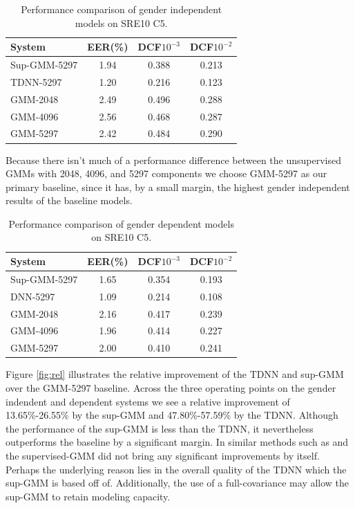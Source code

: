 \documentclass{article}
\begin{document}
\begin{table}
\begin{center}
\begin{tabular}{l|ccc}
\hline
System & EER(\%) & DCF$10^{-3}$ & DCF$10^{-2}$ \\ \hline \hline
Sup-GMM-5297 & 1.94 & 0.388 & 0.213 \\
TDNN-5297 & 1.20 & 0.216 & 0.123 \\
GMM-2048 & 2.49 & 0.496 & 0.288 \\
GMM-4096 & 2.56 & 0.468 & 0.287 \\
GMM-5297 & 2.42 & 0.484 & 0.290 \\ \hline
\end{tabular}
\end{center}
\caption{Performance comparison of gender independent models on SRE10 C5.}
\label{gender_ind}
\end{table}

Because there isn't much of a performance difference between
the unsupervised GMMs with 2048, 4096, and 5297 components we choose
GMM-5297 as our primary baseline, since it has, by a small margin,
the highest gender independent results of the baseline models.

\begin{table}
\begin{center}
\begin{tabular}{l|ccc}
\hline
System & EER(\%) & DCF$10^{-3}$ & DCF$10^{-2}$ \\ \hline \hline
Sup-GMM-5297 & 1.65 & 0.354 & 0.193 \\
DNN-5297 & 1.09 & 0.214 & 0.108 \\
GMM-2048 & 2.16 & 0.417 & 0.239 \\
GMM-4096 & 1.96 & 0.414 & 0.227 \\
GMM-5297 & 2.00 & 0.410 & 0.241 \\ \hline
\end{tabular}
\end{center}
\caption{Performance comparison of gender dependent models on SRE10 C5.}
\label{gender_dep}
\end{table}


Figure \ref{fig:rel} illustrates the relative improvement of the
TDNN and sup-GMM over the GMM-5297 baseline. Across the three
operating points on the gender indendent and dependent systems we 
see a relative improvement of 13.65\%-26.55\%
by the sup-GMM and 47.80\%-57.59\% by the TDNN. Although
the performance of the sup-GMM is less than the TDNN,
it nevertheless outperforms the baseline by a significant
margin. In similar methods such as \cite{lei2014} and \cite{omar2010}
the supervised-GMM did not bring any significant improvements by
itself. Perhaps the underlying reason lies in the overall quality of
the TDNN which the sup-GMM is based off of. Additionally, the use of
a full-covariance may allow the sup-GMM to retain modeling capacity.
\end{document}
